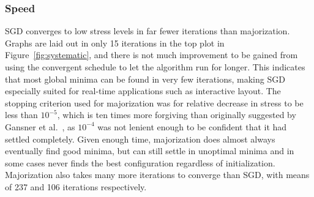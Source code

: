 \subsubsection{Speed}
SGD converges to low stress levels in far fewer iterations than majorization. Graphs are laid out in only 15 iterations in the top plot in Figure~\ref{fig:systematic}, and there is not much improvement to be gained from using the convergent schedule to let the algorithm run for longer. This indicates that most global minima can be found in very few iterations, making SGD especially suited for real-time applications such as interactive layout.
The stopping criterion used for majorization was for relative decrease in stress to be less than $10^{-5}$, which is ten times more forgiving than originally suggested by Gansner et al.\ \cite{Gansner2004}, as $10^{-4}$ was not lenient enough to be confident that it had settled completely. Given enough time, majorization does almost always eventually find good minima, but can still settle in unoptimal minima and in some cases never finds the best configuration regardless of initialization.
Majorization also takes many more iterations to converge than SGD, with means of 237 and 106 iterations respectively.

